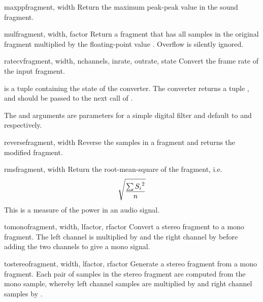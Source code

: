 \begin{funcdesc}{maxpp}{fragment, width}
Return the maximum peak-peak value in the sound fragment.
\end{funcdesc}

\begin{funcdesc}{mul}{fragment, width, factor}
Return a fragment that has all samples in the original fragment
multiplied by the floating-point value .  Overflow is
silently ignored.
\end{funcdesc}

\begin{funcdesc}{ratecv}{fragment, width, nchannels, inrate, outrate,
                         state}
Convert the frame rate of the input fragment.

 is a tuple containing the state of the converter.  The
converter returns a tuple ,
and  should be passed to the next call of
.

The  and  arguments are parameters for a
simple digital filter and default to  and  respectively.
\end{funcdesc}

\begin{funcdesc}{reverse}{fragment, width}
Reverse the samples in a fragment and returns the modified fragment.
\end{funcdesc}

\begin{funcdesc}{rms}{fragment, width}
Return the root-mean-square of the fragment, i.e.
\begin{displaymath}
\catcode`_=8
\sqrt{\frac{\sum{{S_{i}}^{2}}}{n}}
\end{displaymath}
This is a measure of the power in an audio signal.
\end{funcdesc}

\begin{funcdesc}{tomono}{fragment, width, lfactor, rfactor} 
Convert a stereo fragment to a mono fragment.  The left channel is
multiplied by  and the right channel by 
before adding the two channels to give a mono signal.
\end{funcdesc}

\begin{funcdesc}{tostereo}{fragment, width, lfactor, rfactor}
Generate a stereo fragment from a mono fragment.  Each pair of samples
in the stereo fragment are computed from the mono sample, whereby left
channel samples are multiplied by  and right channel
samples by .
\end{funcdesc}

